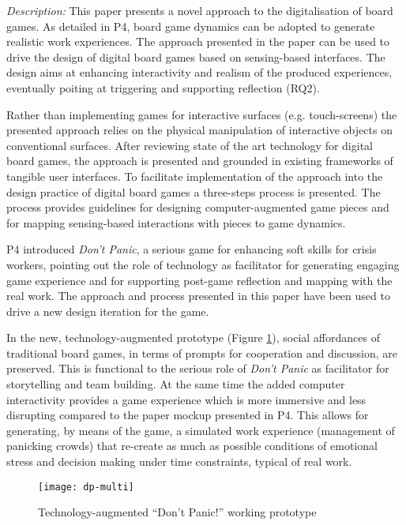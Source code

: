 \emph{Description:} This paper presents a novel approach to the digitalisation of board games. As detailed in P4, board game dynamics can be adopted to generate realistic work experiences. The approach presented in the paper can be used to drive the design of digital board games based on sensing-based interfaces. The design aims at enhancing interactivity and realism of the produced experiences, eventually poiting at triggering and supporting reflection (RQ2).

Rather than implementing games for interactive surfaces (e.g. touch-screens) the presented approach relies on the physical manipulation of interactive objects on conventional surfaces. After reviewing state of the art technology for digital board games, the approach is presented and grounded in existing frameworks of tangible user interfaces. To facilitate implementation of the approach into the design practice of digital board games a three-steps process is presented. The process provides guidelines for designing computer-augmented game pieces and for mapping sensing-based interactions with pieces to game dynamics.

P4 introduced \emph{Don't Panic}, a serious game for enhancing soft skills for crisis workers, pointing out the role of technology as facilitator for generating engaging game experience and for supporting post-game reflection and mapping with the real work. The approach and process presented in this paper have been used to drive a new design iteration for the game. 

In the new, technology-augmented prototype (Figure \ref{fig:dp-token}), social affordances of traditional board games, in terms of prompts for cooperation and discussion, are preserved. This is functional to the serious role of \emph{Don't Panic} as facilitator for storytelling and team building. At the same time the added computer interactivity provides a game experience which is more immersive and less disrupting compared to the paper mockup presented in P4. This allows for generating, by means of the game, a simulated work experience (management of panicking crowds) that re-create as much as possible conditions of emotional stress and decision making under time constraints, typical of real work. 

\begin{figure}
	[tbh] \centering 
	\texttt{[image: dp-multi]} \caption{Technology-augmented “Don't Panic!” working prototype} \label{fig:dp-token} 
\end{figure}

